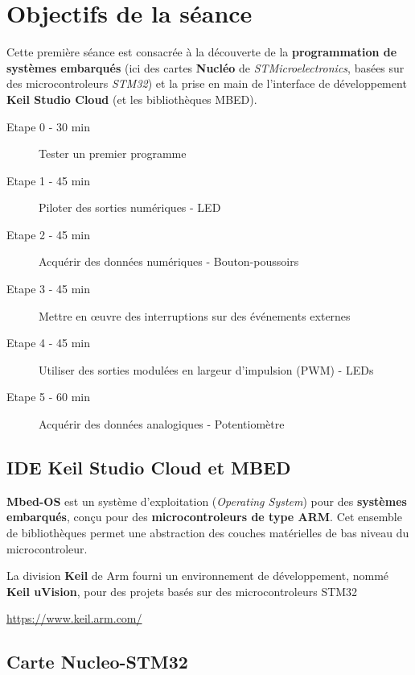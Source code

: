 \documentclass[a4paper,11pt,titlepage]{article} %
\begin{document}
\section{Objectifs de la séance}

Cette première séance est consacrée à la découverte de la \textbf{programmation de systèmes embarqués} (ici des cartes \textbf{Nucléo} de \textit{STMicroelectronics}, basées sur des microcontroleurs \textit{STM32}) et la prise en main de l'interface de développement \textbf{Keil Studio Cloud} (et les bibliothèques MBED).


	\begin{description}
		\item[Etape 0 - 30 min] Tester un premier programme
		\item[Etape 1 - 45 min] Piloter des sorties numériques - LED
		\item[Etape 2 - 45 min] Acquérir des données numériques - Bouton-poussoirs
		\item[Etape 3 - 45 min] Mettre en \oe{}uvre des interruptions sur des événements externes
		\item[Etape 4 - 45 min] Utiliser des sorties modulées en largeur d'impulsion (PWM) - LEDs
		\item[Etape 5 - 60 min] Acquérir des données analogiques - Potentiomètre
	\end{description}	


\subsection{IDE Keil Studio Cloud et MBED}

\textbf{Mbed-OS} est un système d'exploitation (\textit{Operating System}) pour des \textbf{systèmes embarqués}, conçu pour des \textbf{microcontroleurs de type ARM}. Cet ensemble de bibliothèques permet une abstraction des couches matérielles de bas niveau du microcontroleur. 

La division \textbf{Keil} de Arm fourni un environnement de développement, nommé \textbf{Keil uVision}, pour des projets basés sur des microcontroleurs STM32

\href{https://www.keil.arm.com/}{https://www.keil.arm.com/}


\subsection{Carte Nucleo-STM32}
\end{document}
